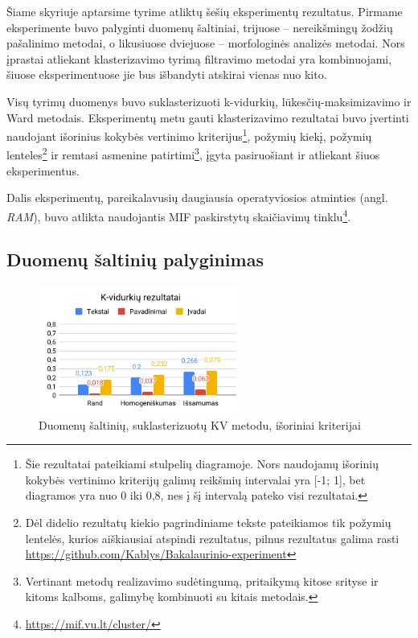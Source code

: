 \documentclass{VUMIFInfBakalaurinis}
\begin{document}
Šiame skyriuje aptarsime tyrime atliktų šešių eksperimentų rezultatus.
Pirmame eksperimente buvo palyginti duomenų šaltiniai, trijuose --
nereikšmingų žodžių pašalinimo metodai, o likusiuose dviejuose --
morfologinės analizės metodai. Nors įprastai atliekant klasterizavimo
tyrimą filtravimo metodai yra kombinuojami, šiuose eksperimentuose jie
bus išbandyti atskirai vienas nuo kito.

Visų tyrimų duomenys buvo suklasterizuoti k-vidurkių,
lūkesčių-maksimizavimo ir Ward metodais. Eksperimentų metu gauti
klasterizavimo rezultatai buvo įvertinti naudojant išorinius kokybės
vertinimo kriterijus\footnote{Šie rezultatai pateikiami stulpelių
  diagramoje. Nors naudojamų išorinių kokybės vertinimo kriterijų galimų reikšmių
  intervalai yra {[}-1; 1{]}, bet diagramos yra nuo 0 iki 0,8, nes į šį
  intervalą pateko visi rezultatai.}, požymių kiekį, požymių
lenteles\footnote{Dėl didelio rezultatų kiekio pagrindiniame tekste
  pateikiamos tik požymių lentelės, kurios aiškiausiai atspindi
  rezultatus, pilnus rezultatus galima rasti \url{https://github.com/Kablys/Bakalaurinio-experiment}}
   ir remtasi asmenine patirtimi\footnote{Vertinant metodų
  realizavimo sudėtingumą, pritaikymą kitose srityse ir kitoms kalboms,
  galimybę kombinuoti su kitais metodais.}, įgyta pasiruošiant ir
atliekant šiuos eksperimentus.

Dalis eksperimentų, pareikalavusių daugiausia operatyviosios atminties
(angl. \emph{RAM}), buvo atlikta naudojantis MIF paskirstytų skaičiavimų
tinklu\footnote{\url{https://mif.vu.lt/cluster/}}.

\subsection{Duomenų šaltinių palyginimas}\label{dsl}

\begin{figure}[H]
	\centering
	\includegraphics[width=0.6\textwidth]{./img/image21.png}
  \caption{Duomenų šaltinių, suklasterizuotų KV metodu, išoriniai kriterijai}
\end{figure}
\end{document}
